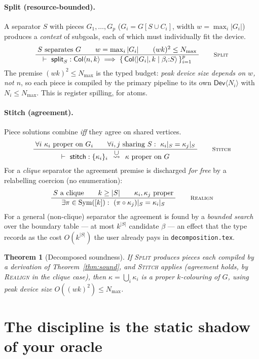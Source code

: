 \documentclass[11pt]{article}
\newtheorem{theorem}{Theorem}[section]
\theoremstyle{definition}
\newcommand{\rn}[1]{\textsc{\footnotesize #1}}
\newcommand{\irule}[2]{\ensuremath{\dfrac{\;#1\;}{\;#2\;}}}
\newcommand{\redto}[1]{\mathrel{\overset{\textstyle #1}{\rightsquigarrow}}}
\newcommand{\Col}{\mathsf{Col}}
\newcommand{\Dev}{\mathsf{Dev}}
\newcommand{\Nmax}{N_{\max}}
\begin{document}
\paragraph{Split (resource-bounded).} A separator $S$ with pieces $G_1,\dots,G_p$
($G_i=G[S\cup C_i]$, width $w=\max_i|G_i|$) produces a \emph{context} of subgoals,
each of which must individually fit the device.
\[
  \irule{S\ \text{separates}\ G \qquad w=\max_i|G_i| \qquad (w k)^2\le \Nmax}
        {\vdash\ \mathsf{split}_S : \Col\langle n,k\rangle \;\Longrightarrow\;
           \{\,\Col\langle |G_i|,k\mid\beta_i{:}S\rangle\,\}_{i=1}^{p}}
  \qquad\rn{Split}
\]
The premise $(wk)^2\le\Nmax$ is the typed budget: \emph{peak device size depends on
$w$, not $n$}, so each piece is compiled by the primary pipeline to its own
$\Dev\langle N_i\rangle$ with $N_i\le\Nmax$. This is register spilling, for atoms.

\paragraph{Stitch (agreement).} Piece solutions combine \emph{iff} they agree on
shared vertices.
\[
  \irule{\forall i\ \kappa_i\ \text{proper on}\ G_i \qquad
         \forall i,j\ \text{sharing}\ S:\ \kappa_i|_S=\kappa_j|_S}
        {\vdash\ \mathsf{stitch} : \{\kappa_i\}_i \;\redto{\ \cup\ }\; \kappa\ \text{proper on}\ G}
  \qquad\rn{Stitch}
\]
For a \emph{clique} separator the agreement premise is discharged \emph{for free}
by a relabelling coercion (no enumeration):
\[
  \irule{S\ \text{a clique} \qquad k\ge|S| \qquad \kappa_i,\kappa_j\ \text{proper}}
        {\exists\pi\in\mathrm{Sym}([k]):\ (\pi\circ\kappa_j)|_S=\kappa_i|_S}
  \qquad\rn{Realign}
\]
For a general (non-clique) separator the agreement is found by a \emph{bounded
search} over the boundary table --- at most $k^{|S|}$ candidate $\beta$ --- an
effect that the type records as the cost $O(k^{|S|})$ the user already pays in
\texttt{decomposition.tex}.

\begin{theorem}[Decomposed soundness]
\label{thm:decsound}
If \rn{Split} produces pieces each compiled by a derivation of
Theorem~\ref{thm:sound}, and \rn{Stitch} applies (agreement holds, by \rn{Realign}
in the clique case), then $\kappa=\bigcup_i\kappa_i$ is a proper $k$-colouring of
$G$, using peak device size $O((wk)^2)\le\Nmax$.
\end{theorem}

\section{The discipline is the static shadow of your oracle}
\label{sec:code}
\end{document}

